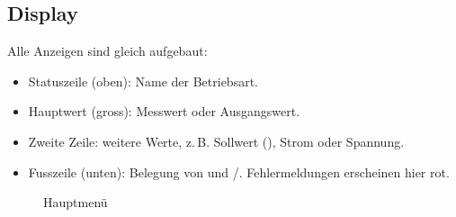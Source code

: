 \subsection{Display}
Alle Anzeigen sind gleich aufgebaut:
\begin{itemize}
    \item Statuszeile (oben): Name der Betriebsart.
    \item Hauptwert (gross): Messwert oder Ausgangswert.
    \item Zweite Zeile: weitere Werte, z.\,B. Sollwert (), Strom oder Spannung.
    \item Fusszeile (unten): Belegung von  und /. Fehlermeldungen erscheinen hier rot.
\end{itemize}
\begin{figure}[h!]
    \centering
    \caption{Hauptmenü}
    \label{fig:idle}
\end{figure}
